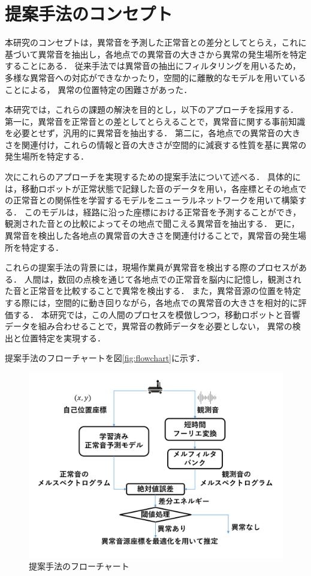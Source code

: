 \documentclass[../main]{subfiles}
\begin{document}
\section{提案手法のコンセプト}

本研究のコンセプトは，異常音を予測した正常音との差分としてとらえ，これに基づいて異常音を抽出し，各地点での異常音の大きさから異常の発生場所を特定することにある．
従来手法では異常音の抽出にフィルタリングを用いるため，多様な異常音への対応ができなかったり，空間的に離散的なモデルを用いていることによる，
異常の位置特定の困難さがあった．

本研究では，これらの課題の解決を目的とし，以下のアプローチを採用する．
第一に，異常音を正常音との差としてとらえることで，異常音に関する事前知識を必要とせず，汎用的に異常音を抽出する．
第二に，各地点での異常音の大きさを関連付け，これらの情報と音の大きさが空間的に減衰する性質を基に異常の発生場所を特定する．


次にこれらのアプローチを実現するための提案手法について述べる．
具体的には，移動ロボットが正常状態で記録した音のデータを用い，各座標とその地点での正常音との関係性を学習するモデルをニューラルネットワークを用いて構築する．
このモデルは，経路に沿った座標における正常音を予測することができ，観測された音との比較によってその地点で聞こえる異常音を抽出する．
更に，異常音を検出した各地点の異常音の大きさを関連付けることで，異常音の発生場所を特定する．

これらの提案手法の背景には，現場作業員が異常音を検出する際のプロセスがある．
人間は，数回の点検を通じて各地点での正常音を脳内に記憶し，観測された音と正常音を比較することで異常を検出する．
また，異常音源の位置を特定する際には，空間的に動き回りながら，各地点での異常音の大きさを相対的に評価する．
本研究では，この人間のプロセスを模倣しつつ，移動ロボットと音響データを組み合わせることで，異常音の教師データを必要としない，
異常の検出と位置特定を実現する．

提案手法のフローチャートを図\ref{fig:flowchart}に示す．

\label{sec:pmethod_concept}

\begin{figure}[t]
  \centering
  \includegraphics[keepaspectratio, width=1.0\linewidth]{chap3/flowchart_proposed_method.png}
  \caption{提案手法のフローチャート}
  \label{fig:fujita_previous_research}
\end{figure}
\end{document}

